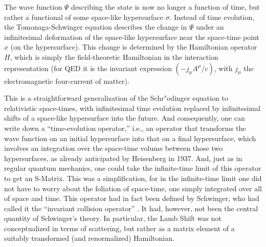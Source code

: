 \documentclass[12pt]{article}
\begin{document}
The wave function $\Psi$ describing the state is now no longer a function of time, but rather a functional of some space-like hypersurface $\sigma$. Instead of time evolution, the Tomonaga-Schwinger equation describes the change in $\Psi$ under an infinitesimal deformation of the space-like hypersurface near the space-time point $x$ (on the hypersurface). This change is determined by the Hamiltonian operator $H$, which is simply the field-theoretic Hamiltonian in the interaction representation (for QED it is the invariant expression $\left( - j_{\mu} A^{\mu}/c \right)$, with $j_{\mu}$ the electromagnetic four-current of matter). 

This is a straightforward generalization of the Schr"odinger equation to relativistic space-times, with infinitesimal time evolution replaced by infinitesimal shifts of a space-like hypersurface into the future. And consequently, one can write down a ``time-evolution operator,'' i.e., an operator that transforms the wave function on an initial hypersurface into that on a final hypersurface, which involves an integration over the space-time volume between those two hypersurfaces, as already anticipated by Heisenberg in 1937. And, just as in regular quantum mechanics, one could take the infinite-time limit of this operator to get an S-Matrix. This was a simplification, for in the infinite-time limit one did not have to worry about the foliation of space-time, one simply integrated over all of space and time. This operator had in fact been defined by Schwinger, who had called it the ``invariant collision operator'' \citep[sec. 4]{schwinger_1948_quantum}. It had, however, not been the central quantity of Schwinger's theory. In particular, the Lamb Shift was not conceptualized in terms of scattering, but rather as a matrix element of a suitably transformed (and renormalized) Hamiltonian.
\end{document}

